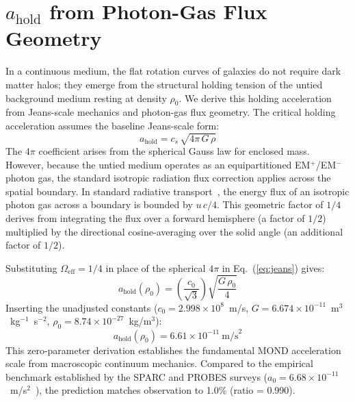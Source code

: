 \documentclass[aps,prd,twocolumn,superscriptaddress,amsmath,amssymb,nofootinbib,floatfix]{revtex4-2}
\newcommand{\amax}{a_{\text{hold}}}
\newcommand{\rhonaught}{\rho_{0}}
\newcommand{\cnaught}{c_{0}}
\begin{document}
\section{$\amax$ from Photon-Gas Flux Geometry}
\label{sec:t1}

In a continuous medium, the flat rotation curves of galaxies do not require dark matter halos; they emerge from the structural holding tension of the untied background medium resting at density $\rhonaught$. We derive this holding acceleration from Jeans-scale mechanics and photon-gas flux geometry. The critical holding acceleration assumes the baseline Jeans-scale form:
\begin{equation}
\amax = c_s \, \sqrt{4\pi \, G \, \rho}
\label{eq:jeans}
\end{equation}
The $4\pi$ coefficient arises from the spherical Gauss law for enclosed mass. However, because the untied medium operates as an equipartitioned EM$^{+}$/EM$^{-}$ photon gas, the standard isotropic radiation flux correction applies across the spatial boundary. In standard radiative transport~\cite{RybickiLightman1979}, the energy flux of an isotropic photon gas across a boundary is bounded by $u\,c/4$. This geometric factor of $1/4$ derives from integrating the flux over a forward hemisphere (a factor of $1/2$) multiplied by the directional cosine-averaging over the solid angle (an additional factor of $1/2$).

Substituting $\Omega_{\text{eff}} = 1/4$ in place of the spherical $4\pi$ in Eq.~(\ref{eq:jeans}) gives:
\begin{equation}
\amax(\rhonaught) = \left(\frac{\cnaught}{\sqrt{3}}\right)\sqrt{\frac{G\,\rhonaught}{4}}
\label{eq:ahold}
\end{equation}
Inserting the unadjusted constants ($\cnaught = 2.998 \times 10^{8}$~m/s, $G = 6.674 \times 10^{-11}$~m$^3$~kg$^{-1}$~s$^{-2}$, $\rhonaught = 8.74 \times 10^{-27}$~kg/m$^3$):
\begin{equation}
\boxed{\amax(\rhonaught) = 6.61 \times 10^{-11}~\text{m/s}^{2}}
\label{eq:aholdresult}
\end{equation}
This zero-parameter derivation establishes the fundamental MOND acceleration scale from macroscopic continuum mechanics. Compared to the empirical benchmark established by the SPARC and PROBES surveys ($a_0 = 6.68 \times 10^{-11}$~m/s$^2$~\cite{McGaugh2016}), the prediction matches observation to 1.0\% (ratio = 0.990).
\end{document}
